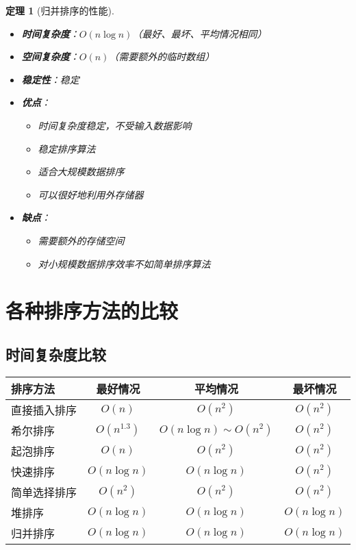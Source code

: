 \documentclass[12pt,a4paper]{amsart}
\newtheorem{theorem}{定理}[section]
\begin{document}
\begin{theorem}[归并排序的性能]
\indent
\begin{itemize}
\item \textbf{时间复杂度}：$O(n\log n)$（最好、最坏、平均情况相同）
\item \textbf{空间复杂度}：$O(n)$（需要额外的临时数组）
\item \textbf{稳定性}：稳定
\item \textbf{优点}：
    \begin{itemize}
    \item 时间复杂度稳定，不受输入数据影响
    \item 稳定排序算法
    \item 适合大规模数据排序
    \item 可以很好地利用外存储器
    \end{itemize}
\item \textbf{缺点}：
    \begin{itemize}
    \item 需要额外的存储空间
    \item 对小规模数据排序效率不如简单排序算法
    \end{itemize}
\end{itemize}
\end{theorem}

\section{各种排序方法的比较}

\subsection{时间复杂度比较}

\begin{center}
\begin{tabular}{|l|c|c|c|}
\hline
\textbf{排序方法} & \textbf{最好情况} & \textbf{平均情况} & \textbf{最坏情况} \\
\hline
直接插入排序 & $O(n)$ & $O(n^2)$ & $O(n^2)$ \\
\hline
希尔排序 & $O(n^{1.3})$ & $O(n\log n) \sim O(n^2)$ & $O(n^2)$ \\
\hline
起泡排序 & $O(n)$ & $O(n^2)$ & $O(n^2)$ \\
\hline
快速排序 & $O(n\log n)$ & $O(n\log n)$ & $O(n^2)$ \\
\hline
简单选择排序 & $O(n^2)$ & $O(n^2)$ & $O(n^2)$ \\
\hline
堆排序 & $O(n\log n)$ & $O(n\log n)$ & $O(n\log n)$ \\
\hline
归并排序 & $O(n\log n)$ & $O(n\log n)$ & $O(n\log n)$ \\
\hline
\end{tabular}
\end{center}
\end{document}

